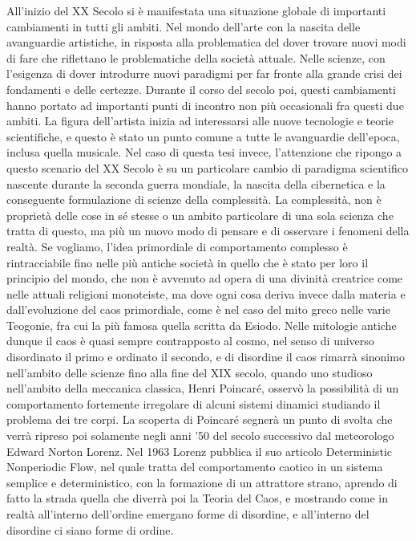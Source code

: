 All'inizio del XX Secolo si è manifestata una situazione globale
di importanti cambiamenti in tutti gli ambiti.
Nel mondo dell'arte con la nascita delle avanguardie artistiche,
in risposta alla problematica del dover trovare nuovi modi di fare
che riflettano le problematiche della società attuale.
Nelle scienze, con l'esigenza di dover introdurre nuovi paradigmi
per far fronte alla grande crisi dei fondamenti e delle certezze.
Durante il corso del secolo poi, questi cambiamenti hanno portato
ad importanti punti di incontro non più occasionali fra questi due ambiti.
La figura dell'artista inizia ad interessarsi alle nuove tecnologie
e teorie scientifiche, e questo è stato un punto comune a tutte le avanguardie
dell'epoca, inclusa quella musicale.
Nel caso di questa tesi invece, l'attenzione che ripongo a questo scenario
del XX Secolo
è su un particolare cambio di paradigma scientifico
nascente durante la seconda guerra mondiale,
la nascita della cibernetica e la conseguente formulazione
di scienze della complessità.
La complessità, non è proprietà delle cose in sé stesse o un ambito particolare
di una sola scienza che tratta di questo,
ma più un nuovo modo di pensare e di osservare i fenomeni
della realtà.
Se vogliamo, l'idea primordiale di comportamento complesso è rintracciabile fino
nelle più antiche società in quello che è stato per loro il principio del mondo,
che non è avvenuto ad opera di una divinità creatrice come nelle attuali
religioni monoteiste,
ma dove ogni cosa deriva invece dalla materia e
dall’evoluzione del caos primordiale,
come è nel caso del mito greco nelle varie Teogonie,
fra cui la più famosa quella scritta da Esiodo.
Nelle mitologie antiche dunque il caos è quasi sempre
contrapposto al cosmo, nel senso di universo disordinato il primo e ordinato
il secondo, e di disordine il caos rimarrà sinonimo
nell'ambito delle scienze fino alla fine del XIX secolo,
quando uno studioso nell'ambito della meccanica classica, Henri Poincaré,
osservò la possibilità di un comportamento fortemente irregolare
di alcuni sistemi dinamici studiando il problema dei tre corpi.
La scoperta di Poincaré segnerà un punto di svolta che verrà
ripreso poi solamente negli anni '50 del secolo successivo dal meteorologo
Edward Norton Lorenz.
Nel 1963 Lorenz pubblica il suo articolo Deterministic Nonperiodic Flow,
nel quale tratta del comportamento caotico in un sistema semplice
e deterministico, con la formazione di un attrattore strano,
aprendo di fatto la strada quella che diverrà poi la Teoria del Caos,
e mostrando come in realtà all'interno dell'ordine emergano forme di disordine,
e all'interno del disordine ci siano forme di ordine.


